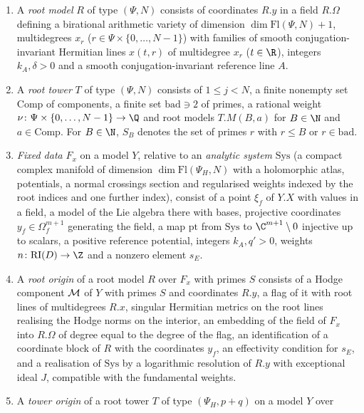 \begin{definition}\label{pf:towergeo:def-towers}
\begin{enumerate}[label=(\alph*)]
\item A \emph{root model} $R$ of type $(\Psi,N)$ consists of coordinates $R.y$ in a field $R.\Omega$
  defining a birational arithmetic variety of dimension $\dim\mathrm{Fl}(\Psi,N)+1$, multidegrees $x_r$
  ($r\in\Psi\times\{0,\dots,N-1\}$) with families of smooth conjugation-invariant Hermitian lines $x(t,r)$
  of multidegree $x_r$ ($t\in\R$), integers $k_A,\delta>0$ and a smooth conjugation-invariant reference
  line $A$.
\item A \emph{root tower} $T$ of type $(\Psi,N)$ consists of $1\le j<N$, a finite nonempty set
  $\mathrm{Comp}$ of components, a finite set $\mathrm{bad}\ni2$ of primes, a rational weight
  $\nu\colon\Psi\times\{0,\dots,N-1\}\to\Q$ and root models $T.M(B,a)$ for $B\in\N$ and
  $a\in\mathrm{Comp}$. For $B\in\N$, $S_B$ denotes the set of primes $r$ with $r\le B$ or
  $r\in\mathrm{bad}$.
\item \emph{Fixed data} $F_x$ on a model $Y$, relative to an \emph{analytic system} $\mathrm{Sys}$ (a
  compact complex manifold of dimension $\dim\mathrm{Fl}(\Psi_H,N)$ with a holomorphic atlas, potentials,
  a normal crossings section and regularised weights indexed by the root indices and one further index),
  consist of a point $\xi_f$ of $Y.X$ with values in a field, a model of the Lie algebra there with
  bases, projective coordinates $y_f\in\Omega_f^{m+1}$ generating the field, a map $\mathrm{pt}$ from
  $\mathrm{Sys}$ to $\C^{m+1}\setminus0$ injective up to scalars, a positive reference potential, integers
  $k_A,q'>0$, weights $n\colon\towergeoRI(D)\to\Z$ and a nonzero element $s_E$.
\item A \emph{root origin} of a root model $R$ over $F_x$ with primes $S$ consists of a Hodge component
  $\mathcal M$ of $Y$ with primes $S$ and coordinates $R.y$, a flag of it with root lines of multidegrees
  $R.x$, singular Hermitian metrics on the root lines realising the Hodge norms on the interior, an
  embedding of the field of $F_x$ into $R.\Omega$ of degree equal to the degree of the flag, an
  identification of a coordinate block of $R$ with the coordinates $y_f$, an effectivity condition for
  $s_E$, and a realisation of $\mathrm{Sys}$ by a logarithmic resolution of $R.y$ with exceptional ideal
  $J$, compatible with the fundamental weights.
\item A \emph{tower origin} of a root tower $T$ of type $(\Psi_H,p+q)$ on a model $Y$ over

\end{enumerate}
\end{definition}

